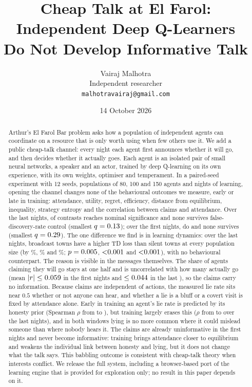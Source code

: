 \documentclass[11pt]{article}
\title{Cheap Talk at El Farol: Independent Deep Q-Learners\\Do Not Develop Informative Talk}
\author{Vairaj Malhotra\\\small Independent researcher\\\small\texttt{malhotravairaj@gmail.com}}
\date{14 October 2026}
\begin{document}
\maketitle

\begin{abstract}
Arthur's El Farol Bar problem asks how a population of independent agents can coordinate on a resource that is only worth using when few others use it. We add a public cheap-talk channel: every night each agent first announces whether it will go, and then decides whether it actually goes. Each agent is an isolated pair of small neural networks, a speaker and an actor, trained by deep Q-learning on its own experience, with its own weights, optimiser and temperament. In a paired-seed experiment with 12 seeds, populations of 80, 100 and 150 agents and \rnightsLong{} nights of learning, opening the channel changes none of the behavioural outcomes we measure, early or late in training: attendance, utility, regret, efficiency, distance from equilibrium, inequality, strategy entropy and the correlation between claims and attendance. Over the last \rnightsLate{} nights, \rnNominalLate{} of \rnTestsLate{} contrasts reaches nominal significance and none survives false-discovery-rate control (smallest $q = 0.13$); over the first \rnightsShort{} nights, \rnNominalShort{} do and none survives (smallest $q = 0.29$). The one difference we find is in learning dynamics: over the last \rnightsLate{} nights, broadcast towns have a higher TD loss than silent towns at every population size (by \rlossPctLXXX\%, \rlossPctC\% and \rlossPctCL\%; $p = 0.005$, $\rlossPC$ and $\rlossPCL$), with no behavioural counterpart. The reason is visible in the messages themselves. The share of agents claiming they will go stays at one half and is uncorrelated with how many actually go (mean $|r| \le 0.059$ in the first \rnightsShort{} nights and $\le 0.044$ in the last \rnightsLate), so the claims carry no information. Because claims are independent of actions, the measured lie rate sits near $0.5$ whether or not anyone can hear, and whether a lie is a bluff or a covert visit is fixed by attendance alone. Early in training an agent's lie rate is predicted by its honesty prior (Spearman $\rho$ from \rrhoLoShort{} to \rrhoHiShort), but training largely erases this ($\rho$ from \rrhoLoLate{} to \rrhoHiLate{} over the last \rnightsLate{} nights), and in both windows lying is no more common where it could mislead someone than where nobody hears it. The claims are already uninformative in the first \rnightsShort{} nights and never become informative: training brings attendance closer to equilibrium and weakens the individual link between honesty and lying, but it does not change what the talk says. This babbling outcome is consistent with cheap-talk theory when interests conflict. We release the full system, including a browser-based port of the learning engine that is provided for exploration only; no result in this paper depends on it.
\end{abstract}
\end{document}
